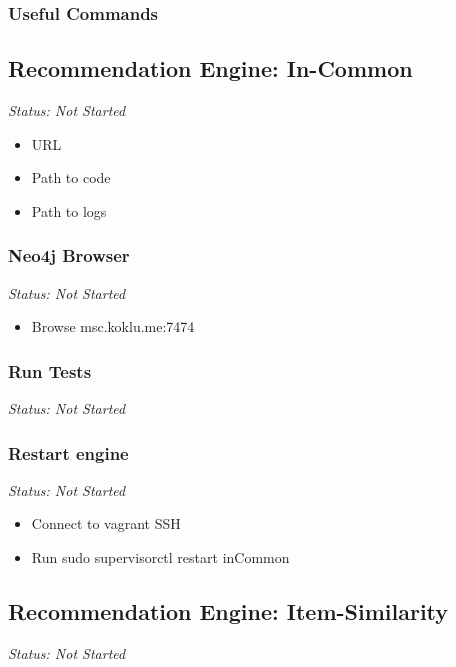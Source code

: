 \subsubsection{Useful Commands}


\subsection{Recommendation Engine: In-Common}

\emph{Status: Not Started}

\begin{itemize}
\item URL
\item Path to code
\item Path to logs
\end{itemize}

\subsubsection{Neo4j Browser}

\emph{Status: Not Started}

\begin{itemize}
\item Browse msc.koklu.me:7474
\end{itemize}

\subsubsection{Run Tests}

\emph{Status: Not Started}

\subsubsection{Restart engine}

\emph{Status: Not Started}

\begin{itemize}
\item Connect to vagrant SSH
\item Run sudo supervisorctl restart inCommon
\end{itemize}


\subsection{Recommendation Engine: Item-Similarity}

\emph{Status: Not Started}


